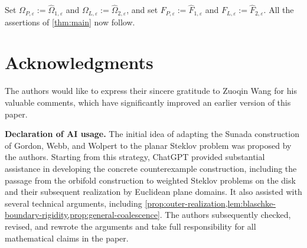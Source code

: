 \documentclass[11pt,letterpaper,reqno]{amsart}
\theoremstyle{definition}
\begin{document}
Set
$\Omega_{P,\varepsilon}:=\widehat\Omega_{1,\varepsilon}$ and
$\Omega_{L,\varepsilon}:=\widehat\Omega_{2,\varepsilon}$, and set
$F_{P,\varepsilon}:=\widehat F_{1,\varepsilon}$ and
$F_{L,\varepsilon}:=\widehat F_{2,\varepsilon}$.
All the assertions of \cref{thm:main} now follow.


\section*{Acknowledgments}
The authors would like to express their sincere gratitude to Zuoqin Wang for his valuable comments, which have significantly improved an earlier version of this paper.

\medskip

{\noindent\bf Declaration of AI usage.}
The initial idea of adapting the Sunada construction of
Gordon, Webb, and Wolpert \cite{GordonWebbWolpert1992} to the planar
Steklov problem was proposed by the authors.  Starting from this
strategy, ChatGPT provided substantial assistance in
developing the concrete counterexample construction, including the
passage from the orbifold construction to weighted Steklov problems
on the disk and their subsequent realization by Euclidean plane
domains.  It also assisted with several technical arguments, including
\cref{prop:outer-realization,lem:blaschke-boundary-rigidity,prop:general-coalescence}. The authors subsequently checked, revised,
and rewrote the arguments and take full responsibility for all
mathematical claims in the paper.
\end{document}
